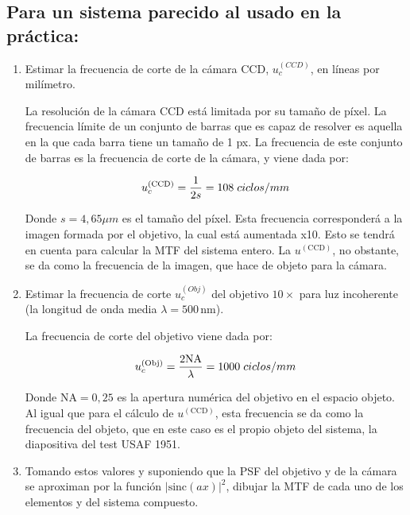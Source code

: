 \documentclass{./packages/optica-article}
\newcommand{\sinc}{\textrm{sinc}}
\begin{document}
\subsection{Para un sistema parecido al usado en la práctica:}\label{sec:cuestion:mtf}
\begin{enumerate}
	\item Estimar la frecuencia de corte de la cámara CCD, $u_{c}^{(CCD)}$, en líneas por milímetro.

	      La resolución de la cámara CCD está limitada por su tamaño de píxel. La frecuencia límite de un conjunto de barras que es capaz de resolver es aquella en la que cada barra tiene un tamaño de 1 px. La frecuencia de este conjunto de barras es la frecuencia de corte de la cámara, y viene dada por:

	      \begin{equation}
		      u_c^{(\textrm{CCD})} = \frac{1}{2s} = 108 \flatfrac{ciclos}{mm}
	      \end{equation}

	      Donde $s=4,65 \mu m$ es el tamaño del píxel. Esta frecuencia corresponderá a la imagen formada por el objetivo, la cual está aumentada x10. Esto se tendrá en cuenta para calcular la MTF del sistema entero. La $u^{(\textrm{CCD})}$, no obstante, se da como la frecuencia de la imagen, que hace de objeto para la cámara.

	\item Estimar la frecuencia de corte $u_{c}^{(Obj)}$ del objetivo $10\times$ para luz incoherente (la longitud de onda media $\lambda=500\,\unit{\nano\metre}$).

	      La frecuencia de corte del objetivo viene dada por:

	      \begin{equation}
		      u_c^{(\textrm{Obj})} = \frac{2 \textrm{NA}}{\lambda} = 1000 \flatfrac{ciclos}{mm}
	      \end{equation}

	      Donde $\textrm{NA}=0,25$ es la apertura numérica del objetivo en el espacio objeto. Al igual que para el cálculo de $u^{(\textrm{CCD})}$, esta frecuencia se da como la frecuencia del objeto, que en este caso es el propio objeto del sistema, la diapositiva del test USAF 1951.

	\item Tomando estos valores y suponiendo que la PSF del objetivo y de la cámara se aproximan por la función $|\sinc(ax)|^2$, dibujar la MTF de cada uno de los elementos y del sistema compuesto.


\end{enumerate}
\end{document}
